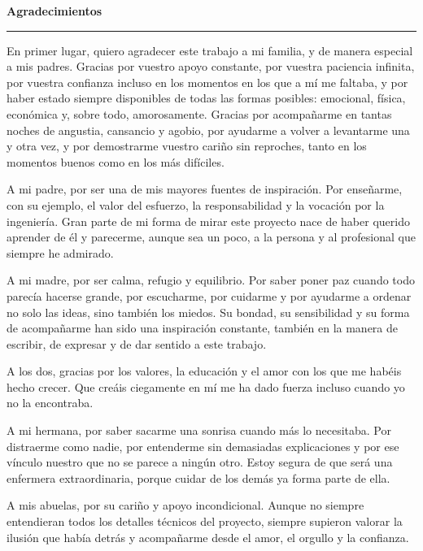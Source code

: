\cleardoublepage
{}

\vspace*{-2.2cm}

{\noindent\Huge\bfseries Agradecimientos\par}
\vspace{0.05cm}
\noindent\rule{\textwidth}{1pt}

\vspace{0.4cm}

En primer lugar, quiero agradecer este trabajo a mi familia, y de manera especial a mis padres. Gracias por vuestro apoyo constante, por vuestra paciencia infinita, por vuestra confianza incluso en los momentos en los que a mí me faltaba, y por haber estado siempre disponibles de todas las formas posibles: emocional, física, económica y, sobre todo, amorosamente. Gracias por acompañarme en tantas noches de angustia, cansancio y agobio, por ayudarme a volver a levantarme una y otra vez, y por demostrarme vuestro cariño sin reproches, tanto en los momentos buenos como en los más difíciles.

A mi padre, por ser una de mis mayores fuentes de inspiración. Por enseñarme, con su ejemplo, el valor del esfuerzo, la responsabilidad y la vocación por la ingeniería. Gran parte de mi forma de mirar este proyecto nace de haber querido aprender de él y parecerme, aunque sea un poco, a la persona y al profesional que siempre he admirado.

A mi madre, por ser calma, refugio y equilibrio. Por saber poner paz cuando todo parecía hacerse grande, por escucharme, por cuidarme y por ayudarme a ordenar no solo las ideas, sino también los miedos. Su bondad, su sensibilidad y su forma de acompañarme han sido una inspiración constante, también en la manera de escribir, de expresar y de dar sentido a este trabajo.

A los dos, gracias por los valores, la educación y el amor con los que me habéis hecho crecer. Que creáis ciegamente en mí me ha dado fuerza incluso cuando yo no la encontraba.

A mi hermana, por saber sacarme una sonrisa cuando más lo necesitaba. Por distraerme como nadie, por entenderme sin demasiadas explicaciones y por ese vínculo nuestro que no se parece a ningún otro. Estoy segura de que será una enfermera extraordinaria, porque cuidar de los demás ya forma parte de ella.

A mis abuelas, por su cariño y apoyo incondicional. Aunque no siempre entendieran todos los detalles técnicos del proyecto, siempre supieron valorar la ilusión que había detrás y acompañarme desde el amor, el orgullo y la confianza.


